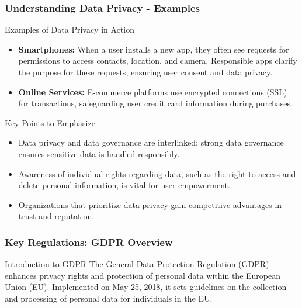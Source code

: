\documentclass[aspectratio=169]{beamer}
\begin{document}
\begin{frame}[fragile]
    \frametitle{Understanding Data Privacy - Examples}
    \begin{block}{Examples of Data Privacy in Action}
        \begin{itemize}
            \item \textbf{Smartphones:} 
            When a user installs a new app, they often see requests for permissions to access contacts, location, and camera.
            Responsible apps clarify the purpose for these requests, ensuring user consent and data privacy.
            
            \item \textbf{Online Services:} 
            E-commerce platforms use encrypted connections (SSL) for transactions, safeguarding user credit card information during purchases.
        \end{itemize}
    \end{block}

    \begin{block}{Key Points to Emphasize}
        \begin{itemize}
            \item Data privacy and data governance are interlinked; strong data governance ensures sensitive data is handled responsibly.
            \item Awareness of individual rights regarding data, such as the right to access and delete personal information, is vital for user empowerment.
            \item Organizations that prioritize data privacy gain competitive advantages in trust and reputation.
        \end{itemize}
    \end{block}
\end{frame}

\begin{frame}[fragile]
    \frametitle{Key Regulations: GDPR Overview}
    \begin{block}{Introduction to GDPR}
        The General Data Protection Regulation (GDPR) enhances privacy rights and protection of personal data within the European Union (EU). Implemented on May 25, 2018, it sets guidelines on the collection and processing of personal data for individuals in the EU.
    \end{block}
\end{frame}
\end{document}
